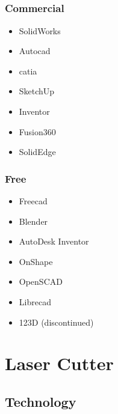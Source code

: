 \documentclass[aspectratio=169]{beamer}
\begin{document}
\subsection{}
\subsubsection{Commercial}
\begin{frame}
    \begin{itemize}
        \item SolidWorks
        \item Auto\acs{cad}
        \item \acs{catia}
        \item SketchUp
        \item Inventor
        \item Fusion360
        \item SolidEdge
    \end{itemize}
\end{frame}

\subsubsection{Free}
\begin{frame}
    \begin{itemize}
        \item Free\acs{cad}
        \item Blender
        \item AutoDesk Inventor
        \item OnShape
        \item OpenSCAD
        \item Libre\acs{cad}
        \item 123D (discontinued)
    \end{itemize}
\end{frame}

\section{Laser Cutter}

\subsection{Technology}
\end{document}
